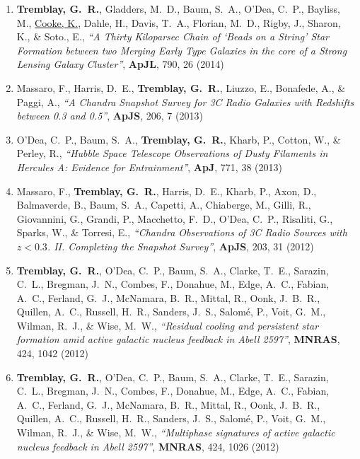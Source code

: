 \documentclass[11pt]{article}
\begin{document}
\begin{enumerate}
\item {\bf Tremblay, G.~R.}, Gladders, M.~D., Baum, S.~A., O'Dea, C.~P., Bayliss, M., \uline{Cooke, K.}, Dahle, H., Davis, T.~A., Florian, M.~D., Rigby, J., Sharon, K., \& Soto., E.,   {\it ``A Thirty Kiloparsec Chain of `Beads on a String' Star Formation between two Merging Early Type Galaxies in the core of a Strong Lensing Galaxy Cluster''}, \textbf{ApJL}, 790, 26 (2014)


\item Massaro, F., Harris, D.~E., {\bf Tremblay, G.~R.}, Liuzzo, E., Bonafede, A., 
\& Paggi, A., {\it ``A Chandra Snapshot Survey for 3C Radio Galaxies with Redshifts between 0.3 and 0.5''}, \textbf{ApJS}, 206,  7 (2013)


\item O'Dea, C.~P., Baum, S.~A., {\bf Tremblay, G.~R.}, Kharb, P., Cotton, W., 
\& Perley, R.,  {\it ``Hubble Space Telescope Observations of Dusty Filaments in Hercules A: Evidence for Entrainment''}, \textbf{ApJ}, 771,  38 (2013)


\item Massaro, F., {\bf Tremblay, G.~R.}, Harris, D.~E., Kharb, P., Axon, D., 
Balmaverde, B., Baum, S.~A., Capetti, A., Chiaberge, M., Gilli, R., 
Giovannini, G., Grandi, P., Macchetto, F.~D., O'Dea, C.~P., Risaliti, G., 
Sparks, W., \& Torresi, E.,  {\it ``Chandra Observations of 3C Radio Sources with $z < 0.3$. II. Completing the Snapshot Survey''}, \textbf{ApJS}, 203,  31 (2012)




\item {\bf Tremblay, G.~R.}, O'Dea, C.~P., Baum, S.~A., Clarke, T.~E., Sarazin, 
C.~L., Bregman, J.~N., Combes, F., Donahue, M., Edge, A.~C., Fabian, A.~C., 
Ferland, G.~J., McNamara, B.~R., Mittal, R., Oonk, J.~B.~R., Quillen, 
A.~C., Russell, H.~R., Sanders, J.~S., Salom{\'e}, P., Voit, G.~M., Wilman, 
R.~J., \& Wise, M.~W., {\it ``Residual cooling and persistent star formation amid active galactic nucleus feedback in Abell 2597''}, \textbf{MNRAS}, 424,  1042 (2012)


\item {\bf Tremblay, G.~R.}, O'Dea, C.~P., Baum, S.~A., Clarke, T.~E., Sarazin, 
C.~L., Bregman, J.~N., Combes, F., Donahue, M., Edge, A.~C., Fabian, A.~C., 
Ferland, G.~J., McNamara, B.~R., Mittal, R., Oonk, J.~B.~R., Quillen, 
A.~C., Russell, H.~R., Sanders, J.~S., Salom{\'e}, P., Voit, G.~M., Wilman, 
R.~J., \& Wise, M.~W., {\it  ``Multiphase signatures of active galactic nucleus feedback in Abell 2597''}, \textbf{MNRAS}, 424,  1026 (2012)




\end{enumerate}
\end{document}
